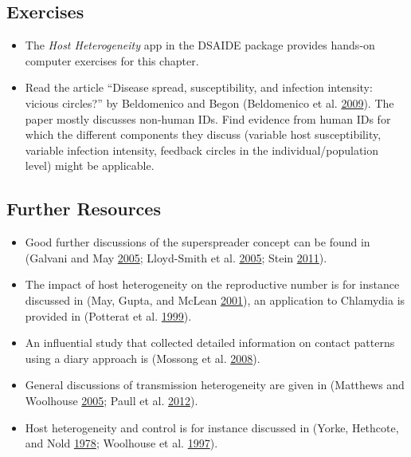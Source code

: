 \documentclass[]{article}
\providecommand{\tightlist}{%
  \setlength{\itemsep}{0pt}\setlength{\parskip}{0pt}}
\theoremstyle{definition}
\theoremstyle{definition}
\theoremstyle{definition}
\theoremstyle{remark}
\begin{document}
\subsection{Exercises}\label{exercises-9}

\begin{itemize}
\tightlist
\item
  The \emph{Host Heterogeneity} app in the DSAIDE package provides
  hands-on computer exercises for this chapter.
\item
  Read the article ``Disease spread, susceptibility, and infection
  intensity: vicious circles?'' by Beldomenico and Begon (Beldomenico et
  al. \protect\hyperlink{ref-beldomenico09}{2009}). The paper mostly
  discusses non-human IDs. Find evidence from human IDs for which the
  different components they discuss (variable host susceptibility,
  variable infection intensity, feedback circles in the
  individual/population level) might be applicable.
\end{itemize}

\subsection{Further Resources}\label{further-resources-9}

\begin{itemize}
\tightlist
\item
  Good further discussions of the superspreader concept can be found in
  (Galvani and May \protect\hyperlink{ref-galvani05}{2005}; Lloyd-Smith
  et al. \protect\hyperlink{ref-lloyd-smith05}{2005}; Stein
  \protect\hyperlink{ref-stein11}{2011}).
\item
  The impact of host heterogeneity on the reproductive number is for
  instance discussed in (May, Gupta, and McLean
  \protect\hyperlink{ref-may01}{2001}), an application to Chlamydia is
  provided in (Potterat et al.
  \protect\hyperlink{ref-potterat99}{1999}).
\item
  An influential study that collected detailed information on contact
  patterns using a diary approach is (Mossong et al.
  \protect\hyperlink{ref-mossong08}{2008}).
\item
  General discussions of transmission heterogeneity are given in
  (Matthews and Woolhouse \protect\hyperlink{ref-matthews05}{2005};
  Paull et al. \protect\hyperlink{ref-paull12}{2012}).
\item
  Host heterogeneity and control is for instance discussed in (Yorke,
  Hethcote, and Nold \protect\hyperlink{ref-yorke78}{1978}; Woolhouse et
  al. \protect\hyperlink{ref-woolhouse97}{1997}).
\end{itemize}
\end{document}
